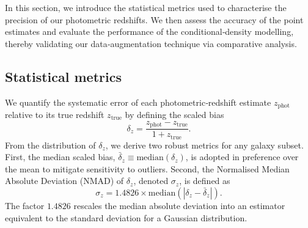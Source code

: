 In this section, we introduce the statistical metrics used to characterise the precision of our photometric redshifts. We then assess the accuracy of the point estimates and evaluate the performance of the conditional‐density modelling, thereby validating our data‐augmentation technique via comparative analysis.

\subsection{Statistical metrics}
We quantify the systematic error of each photometric‐redshift estimate \(z_\mathrm{phot}\) relative to its true redshift \(z_\mathrm{true}\) by defining the scaled bias
\begin{equation} \label{eqa:4}
    \delta_z = \frac{z_\mathrm{phot} - z_\mathrm{true}}{1 + z_\mathrm{true}}.
\end{equation}
From the distribution of \(\delta_z\), we derive two robust metrics for any galaxy subset. First, the median scaled bias, \(\bar{\delta}_z \equiv \mathrm{median} \left( \delta_z \right)\), is adopted in preference over the mean to mitigate sensitivity to outliers. Second, the Normalised Median Absolute Deviation (NMAD) of \(\delta_z\), denoted \(\sigma_z\), is defined as
\begin{equation} \label{eqa:5}
    \sigma_z = 1.4826 \times \mathrm{median} \left( \left| \delta_z - \bar{\delta}_z \right| \right).
\end{equation} 
The factor \(1.4826\) rescales the median absolute deviation into an estimator equivalent to the standard deviation for a Gaussian distribution.

